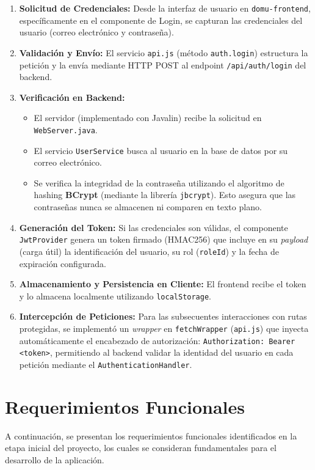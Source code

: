 \begin{enumerate}
    \item \textbf{Solicitud de Credenciales:} Desde la interfaz de usuario en \texttt{domu-frontend}, específicamente en el componente de Login, se capturan las credenciales del usuario (correo electrónico y contraseña).
    \item \textbf{Validación y Envío:} El servicio \texttt{api.js} (método \texttt{auth.login}) estructura la petición y la envía mediante HTTP POST al endpoint \texttt{/api/auth/login} del backend.
    \item \textbf{Verificación en Backend:}
    \begin{itemize}
        \item El servidor (implementado con Javalin) recibe la solicitud en \texttt{WebServer.java}.
        \item El servicio \texttt{UserService} busca al usuario en la base de datos por su correo electrónico.
        \item Se verifica la integridad de la contraseña utilizando el algoritmo de hashing \textbf{BCrypt} (mediante la librería \texttt{jbcrypt}). Esto asegura que las contraseñas nunca se almacenen ni comparen en texto plano.
    \end{itemize}
    \item \textbf{Generación del Token:} Si las credenciales son válidas, el componente \texttt{JwtProvider} genera un token firmado (HMAC256) que incluye en su \textit{payload} (carga útil) la identificación del usuario, su rol (\texttt{roleId}) y la fecha de expiración configurada.
    \item \textbf{Almacenamiento y Persistencia en Cliente:} El frontend recibe el token y lo almacena localmente utilizando \texttt{localStorage}.
    \item \textbf{Intercepción de Peticiones:} Para las subsecuentes interacciones con rutas protegidas, se implementó un \textit{wrapper} en \texttt{fetchWrapper} (\texttt{api.js}) que inyecta automáticamente el encabezado de autorización: \texttt{Authorization: Bearer <token>}, permitiendo al backend validar la identidad del usuario en cada petición mediante el \texttt{AuthenticationHandler}.
\end{enumerate}

\section{Requerimientos Funcionales}
A continuación, se presentan los requerimientos funcionales identificados en la etapa inicial del proyecto, los cuales se consideran fundamentales para el desarrollo de la aplicación.

